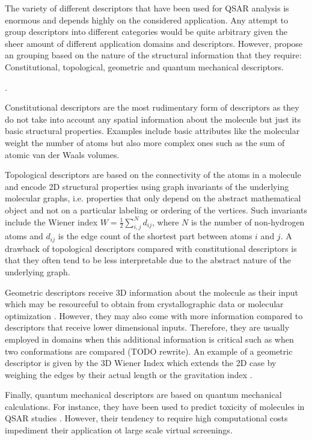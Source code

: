 The variety of different descriptors that have been used for QSAR analysis is enormous and depends highly on the considered application.
Any attempt to group descriptors into different categories would be quite arbitrary given the sheer amount of different application domains and descriptors. However, \cite{descript} propose an grouping based on the nature of the structural information that they require: Constitutional, topological, geometric and quantum mechanical descriptors. 

.

Constitutional descriptors are the most rudimentary form of descriptors as they do not take into account any spatial information about the molecule but just its basic structural properties. Examples include basic attributes like the molecular weight the number of atoms but also more complex ones such as the sum of atomic van der Waals volumes. 

Topological descriptors are based on the connectivity of the atoms in a molecule and encode 2D structural properties using graph invariants of the underlying molecular graphs, i.e. properties that only depend on the abstract mathematical object and not on a particular labeling or ordering of the vertices. Such invariants include the Wiener index \cite{wiener1947structural, nikolic2001wiener} $W = \frac{1}{2} \sum_{i,j}^ N d_{ij}$, where $N$ is the number of non-hydrogen atoms and $d_{ij}$ is the edge count of the shortest part between atoms $i$ and $j$. A drawback of topological descriptors compared with constitutional descriptors is that they often tend to be less interpretable due to the abstract nature of the underlying graph. 

Geometric descriptors receive 3D information about the molecule as their input which may be resourceful to obtain from crystallographic data or molecular optimization \cite{Mauri2016}. However, they may also come with more information compared to descriptors that receive lower dimensional inputs. Therefore, they are usually employed in domains when this additional information is critical such as when two conformations are compared (TODO rewrite). An example of a geometric descriptor is given by the 3D Wiener Index which extends the 2D case by weighing the edges by their actual length or the gravitation index \cite{katritzky1996correlation}.

Finally, quantum mechanical descriptors are based on quantum mechanical calculations. For instance, they have been used to predict toxicity of molecules in QSAR studies \citep{REENU201589, senior2011qstr}. However, their tendency to require high computational costs impediment their application ot large scale virtual screenings.

